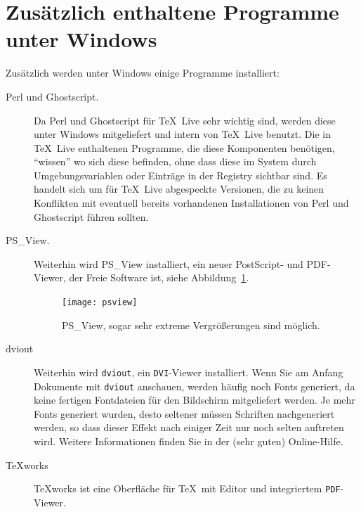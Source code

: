 \documentclass[12pt,ngerman,a4paper,fullparskip]{scrreprt}
\newcommand{\TL}{\TeX\ Live\xspace}
\newcommand{\acro}[1]{\texttt{#1}}
\newcommand{\cmdname}[1]{\texttt{#1}}
\newcommand{\prog}[1]{\texttt{#1}}
\begin{document}
\section{Zusätzlich enthaltene Programme unter Windows}

Zusätzlich werden unter Windows einige Programme installiert:

\begin{description}
\item[Perl und Ghostscript.] Da Perl und Ghostscript für \TL sehr wichtig sind, werden diese   unter Windows mitgeliefert und intern von \TL benutzt. Die in \TL enthaltenen Programme, die diese Komponenten benötigen, \enquote{wissen} wo sich diese befinden, ohne dass diese im System durch  Umgebungsvariablen oder Einträge in der Registry sichtbar sind. Es handelt sich um für \TL abgespeckte Versionen, die zu keinen Konflikten mit eventuell bereits vorhandenen Installationen von Perl und Ghostscript führen sollten.

\item[PS\_View.] Weiterhin wird PS\_View installiert, ein neuer PostScript- und PDF-Viewer, der Freie Software ist, siehe Abbildung~\ref{fig:psview}.

\begin{figure}[tb]
\begin{center}
\texttt{[image: psview]}
\caption{PS\_View, sogar sehr extreme Vergrößerungen sind möglich.}\label{fig:psview}
\end{center}
\end{figure}

\item[dviout] Weiterhin wird \prog{dviout}, ein \acro{DVI}-Viewer installiert.
Wenn Sie am Anfang Dokumente mit \cmdname{dviout} anschauen, werden häufig noch Fonts generiert, da keine fertigen Fontdateien für den Bildschirm mitgeliefert werden. Je mehr Fonts generiert wurden, desto seltener müssen Schriften nachgeneriert werden, so dass dieser Effekt nach einiger Zeit nur noch selten auftreten wird. Weitere Informationen finden Sie in der (sehr guten) Online-Hilfe. \enlargethispage{1cm}

\item[TeXworks] \TeX{}works ist eine Oberfläche für \TeX\ mit Editor und
   integriertem \acro{PDF}-Viewer.


\end{description}
\end{document}
